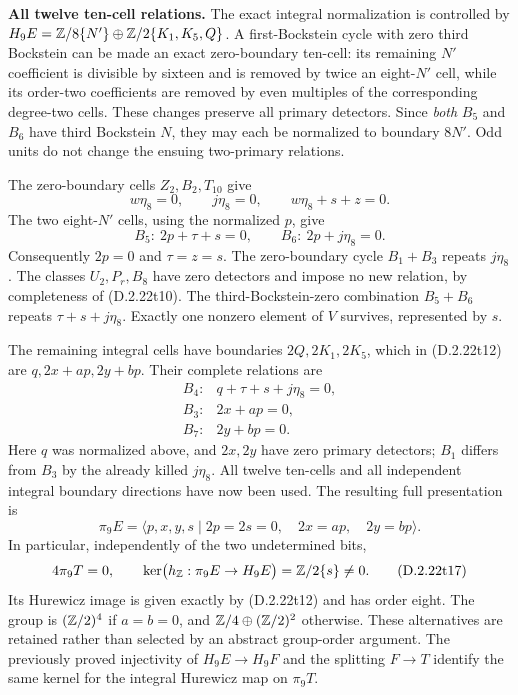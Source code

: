 \medskip\noindent
\textbf{All twelve ten-cell relations.}
The exact integral normalization is controlled by
$H_9E=\mathbb Z/8\{N'\}\oplus\mathbb Z/2\{K_1,K_5,Q\}$.
A first-Bockstein cycle with zero third Bockstein can be
made an exact zero-boundary ten-cell: its remaining $N'$
coefficient is divisible by sixteen and is removed by twice
an eight-$N'$ cell, while its order-two coefficients are
removed by even multiples of the corresponding degree-two
cells.  These changes preserve all primary detectors.
Since \emph{both} $B_5$ and $B_6$ have third Bockstein $N$,
they may each be normalized to boundary $8N'$.
Odd units do not change the ensuing two-primary relations.

The zero-boundary cells $Z_2,B_2,T_{10}$ give
\[
 w\eta_8=0,
       \qquad j\eta_8=0,
       \qquad w\eta_8+s+z=0.
 \tag{D.2.22t13}
\]
The two eight-$N'$ cells, using the normalized $p$, give
\[
 B_5:\ 2p+\tau+s=0,
       \qquad B_6:\ 2p+j\eta_8=0.
 \tag{D.2.22t14}
\]
Consequently $2p=0$ and $\tau=z=s$.
The zero-boundary cycle $B_1+B_3$ repeats $j\eta_8$.
The classes $U_2,P_r,B_8$ have zero detectors and impose
no new relation, by completeness of \textup{(D.2.22t10)}.
The third-Bockstein-zero combination $B_5+B_6$ repeats
$\tau+s+j\eta_8$.  Exactly one nonzero element of $V$
survives, represented by $s$.

The remaining integral cells have boundaries
$2Q,2K_1,2K_5$, which in \textup{(D.2.22t12)} are
$q,2x+ap,2y+bp$.  Their complete relations are
\[
 \begin{array}{ll}
 B_4:&q+\tau+s+j\eta_8=0,\\
 B_3:&2x+ap=0,\\
 B_7:&2y+bp=0.
 \end{array}
 \tag{D.2.22t15}
\]
Here $q$ was normalized above, and $2x,2y$ have zero
primary detectors; $B_1$ differs from $B_3$ by the already
killed $j\eta_8$.  All twelve ten-cells and all independent
integral boundary directions have now been used.
The resulting full presentation is
\[
 \pi_9E=
 \langle p,x,y,s\mid
       2p=2s=0,\quad2x=ap,\quad2y=bp\rangle.
 \tag{D.2.22t16}
\]
In particular, independently of the two undetermined bits,
\[
 4\pi_9T=0,
 \qquad
 \ker\bigl(h_{\mathbb Z}:\pi_9E\to H_9E\bigr)
       =\mathbb Z/2\{s\}\ne0.
 \tag{D.2.22t17}
\]
Its Hurewicz image is given exactly by
\textup{(D.2.22t12)} and has order eight.
The group is $(\mathbb Z/2)^4$ if $a=b=0$, and
$\mathbb Z/4\oplus(\mathbb Z/2)^2$ otherwise.
These alternatives are retained rather than selected by
an abstract group-order argument.
The previously proved injectivity of $H_9E\to H_9F$
and the splitting $F\to T$ identify the same kernel for
the integral Hurewicz map on $\pi_9T$.

